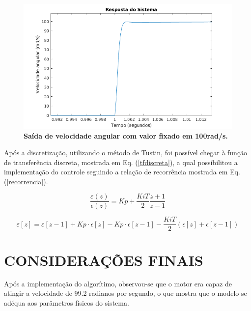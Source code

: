 \documentclass[10pt,fleqn,a4paper]{article}
\begin{document}
	\begin{figure}[ht]
		\begin{center}
			\includegraphics[angle=0, scale=0.6]{images/sistemStep}
		\end{center}
		\caption{\textbf{Saída de velocidade angular com valor fixado em 100rad/s.}}
		\label{fig:saidasimulada}
	\end{figure}
    
    Após a discretização, utilizando o método de Tustin, foi possível chegar à função de transferência discreta, mostrada em Eq. (\ref{tfdiscreta}), a qual possibilitou a implementação do controle seguindo a relação de recorrência mostrada em Eq. (\ref{recorrencia}).
    
    \begin{equation}
    \frac{\varepsilon(z)}{\epsilon(z)}= Kp + \frac{Ki T}{2}\frac{z+1}{z-1} \label{tfdiscreta}
    \end{equation}
    
    \begin{equation}
    \varepsilon[z] = \varepsilon[z-1] + Kp\cdot\epsilon[z] - Kp\cdot\epsilon[z-1] - \frac{Ki T}{2}(\epsilon[z] + \epsilon[z-1]) \label{recorrencia}
    \end{equation}
    
    \newpage
    
    \section{CONSIDERAÇÕES FINAIS}
    
    Após a implementação do algorítimo, observou-se que o motor era capaz de atingir a velocidade de 99.2 radianos por segundo, o que mostra que o modelo se adéqua aos parâmetros físicos do sistema.
    
\end{document}
